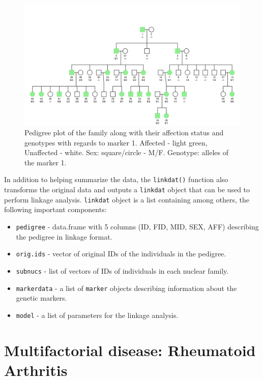 \documentclass[a4paper,12pt]{article}
\begin{document}
\begin{figure}[ht!] %
    \centering
    \includegraphics[width=\textwidth]{images/pedigree_plot.png}
    \caption{Pedigree plot of the family along with their affection status and genotypes with 
    regards to marker 1.
    Affected - light green, Unaffected - white. Sex: square/circle - M/F. Genotype: alleles of the marker 1.}
    \label{fig:pedigree} %

    
\end{figure}

In addition to helping summarize the data, the \texttt{linkdat()} function also transforms the original data
and outputs a \texttt{linkdat} object that can be used to perform linkage analysis. \texttt{linkdat} object 
is a list containing among others, the following important components:
\begin{itemize}
    \item \texttt{pedigree} - data.frame with 5 columns (ID, FID, MID, SEX, AFF) describing the pedigree in linkage format.
    \item \texttt{orig.ids} - vector of original IDs of the individuals in the pedigree.
    \item \texttt{subnucs} - list of vectors of IDs of individuals in each nuclear family.
    \item \texttt{markerdata} - a list of \texttt{marker} objects describing information about the genetic markers.
    \item \texttt{model} - a list of parameters for the linkage analysis.

\end{itemize}

\newpage
    \section{Multifactorial disease: Rheumatoid Arthritis}
\end{document}
